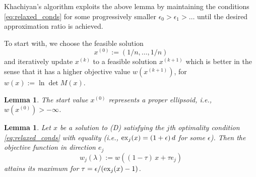 \documentclass[a4paper,twocolumn]{article}
\newcommand{\excess}{\ensuremath{\mathop{\rm ex}\nolimits}}
\newtheorem{lemma}[theorem]{Lemma}
\begin{document}
Khachiyan's algorithm exploits the above lemma by maintaining the
conditions \eqref{eq:relaxed_conds} for some progressively smaller
$\epsilon_0>\epsilon_1>\ldots$ until the desired approximation ratio
is achieved.

To start with, we choose the feasible solution
\begin{equation}
  \label{eq:feasible}
  x^{(0)} := (1/n,\ldots,1/n)
\end{equation}
and iteratively update $x^{(k)}$ to a feasible solution $x^{(k+1)}$
which is better in the sense that it has a higher objective value %
$w(x^{(k+1)})$, for $w(x):= \ln \det M(x)$.

\begin{lemma}
  \label{lemma:start}
  The start value $x^{(0)}$ represents a proper ellipsoid, i.e.,
  $w(x^{(0)})>-\infty$.
\end{lemma}


\begin{lemma}
  Let $x$ be a solution to (D) satisfying the $j$th optimality
  condition \eqref{eq:relaxed_conds} with equality (i.e.,
  $\excess_j(x)=(1+\epsilon)\,d$ for some $\epsilon$).  Then
  the objective function in direction $e_j$
  \begin{equation}
    \label{eq:lin_search}
    w_j(\lambda):= w((1-\tau)\,x + \tau e_j)
  \end{equation}
  attains its maximum for $\tau = \epsilon / (\excess_j(x) - 1)$.
\end{lemma}
\end{document}
